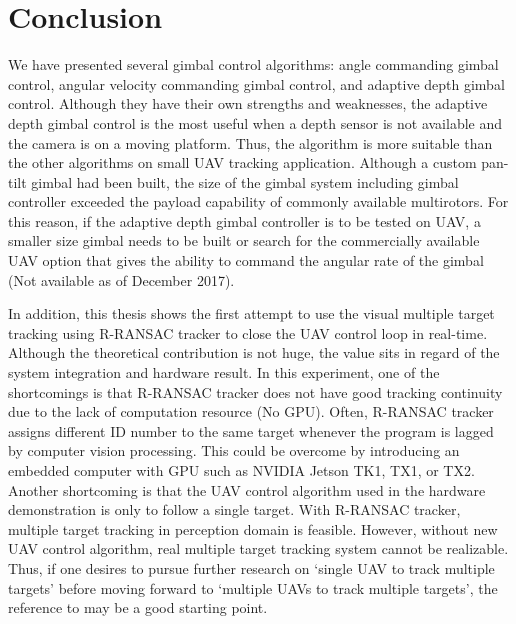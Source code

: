 \chapter{Conclusion}
\label{chapter5}
We have presented several gimbal control algorithms: angle commanding gimbal control, angular velocity commanding gimbal control, and adaptive depth gimbal control. Although they have their own strengths and weaknesses, the adaptive depth gimbal control is the most useful when a depth sensor is not available and the camera is on a moving platform. Thus, the algorithm is more suitable than the other algorithms on small UAV tracking application. Although a custom pan-tilt gimbal had been built, the size of the gimbal system including gimbal controller exceeded the payload capability of commonly available multirotors. For this reason, if the adaptive depth gimbal controller is to be tested on UAV, a smaller size gimbal needs to be built or search for the commercially available UAV option that gives the ability to command the angular rate of the gimbal (Not available as of December 2017). 

In addition, this thesis shows the first attempt to use the visual multiple target tracking using R-RANSAC tracker to close the UAV control loop in real-time. Although the theoretical contribution is not huge, the value sits in regard of the system integration and hardware result. In this experiment, one of the shortcomings is that R-RANSAC tracker does not have good tracking continuity due to the lack of computation resource (No GPU). Often, R-RANSAC tracker assigns different ID number to the same target whenever the program is lagged by computer vision processing. This could be overcome by introducing an embedded computer with GPU such as NVIDIA Jetson TK1, TX1, or TX2. Another shortcoming is that the UAV control algorithm used in the hardware demonstration is only to follow a single target. With R-RANSAC tracker, multiple target tracking in perception domain is feasible. However, without new UAV control algorithm, real multiple target tracking system cannot be realizable. Thus, if one desires to pursue further research on \lq single UAV to track multiple targets\rq\: before moving forward to \lq multiple UAVs to track multiple targets\rq, the reference to \cite{Gans2011} may be a good starting point.

